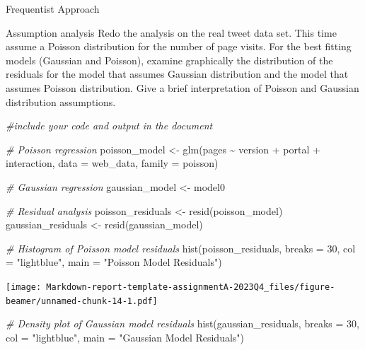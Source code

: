 \documentclass[
  ignorenonframetext,
]{beamer}
\newenvironment{Shaded}{\begin{snugshade}}{\end{snugshade}}
\newcommand{\AttributeTok}[1]{\textcolor[rgb]{0.77,0.63,0.00}{#1}}
\newcommand{\CommentTok}[1]{\textcolor[rgb]{0.56,0.35,0.01}{\textit{#1}}}
\newcommand{\DecValTok}[1]{\textcolor[rgb]{0.00,0.00,0.81}{#1}}
\newcommand{\FunctionTok}[1]{\textcolor[rgb]{0.00,0.00,0.00}{#1}}
\newcommand{\NormalTok}[1]{#1}
\newcommand{\OtherTok}[1]{\textcolor[rgb]{0.56,0.35,0.01}{#1}}
\newcommand{\SpecialCharTok}[1]{\textcolor[rgb]{0.00,0.00,0.00}{#1}}
\newcommand{\StringTok}[1]{\textcolor[rgb]{0.31,0.60,0.02}{#1}}
\begin{document}
\begin{frame}[fragile]{Frequentist Approach}
\begin{block}{Assumption analysis}
\protect\hypertarget{assumption-analysis}{}
Redo the analysis on the real tweet data set. This time assume a Poisson
distribution for the number of page visits. For the best fitting models
(Gaussian and Poisson), examine graphically the distribution of the
residuals for the model that assumes Gaussian distribution and the model
that assumes Poisson distribution. Give a brief interpretation of
Poisson and Gaussian distribution assumptions.

\begin{Shaded}
\begin{Highlighting}[]
\CommentTok{\#include your code and output in the document}

\CommentTok{\# Poisson regression}
\NormalTok{poisson\_model }\OtherTok{\textless{}{-}} \FunctionTok{glm}\NormalTok{(pages }\SpecialCharTok{\textasciitilde{}}\NormalTok{ version }\SpecialCharTok{+}\NormalTok{ portal }\SpecialCharTok{+}\NormalTok{ interaction, }\AttributeTok{data =}\NormalTok{ web\_data, }\AttributeTok{family =}\NormalTok{ poisson)}

\CommentTok{\# Gaussian regression}
\NormalTok{gaussian\_model }\OtherTok{\textless{}{-}}\NormalTok{ model0}

\CommentTok{\# Residual analysis}
\NormalTok{poisson\_residuals }\OtherTok{\textless{}{-}} \FunctionTok{resid}\NormalTok{(poisson\_model)}
\NormalTok{gaussian\_residuals }\OtherTok{\textless{}{-}} \FunctionTok{resid}\NormalTok{(gaussian\_model)}

\CommentTok{\# Histogram of Poisson model residuals}
\FunctionTok{hist}\NormalTok{(poisson\_residuals, }\AttributeTok{breaks =} \DecValTok{30}\NormalTok{, }\AttributeTok{col =} \StringTok{"lightblue"}\NormalTok{, }\AttributeTok{main =} \StringTok{"Poisson Model Residuals"}\NormalTok{)}
\end{Highlighting}
\end{Shaded}

\texttt{[image: Markdown-report-template-assignmentA-2023Q4\_files/figure-beamer/unnamed-chunk-14-1.pdf]}

\begin{Shaded}
\begin{Highlighting}[]
\CommentTok{\# Density plot of Gaussian model residuals}
\FunctionTok{hist}\NormalTok{(gaussian\_residuals, }\AttributeTok{breaks =} \DecValTok{30}\NormalTok{, }\AttributeTok{col =} \StringTok{"lightblue"}\NormalTok{, }\AttributeTok{main =} \StringTok{"Gaussian Model Residuals"}\NormalTok{)}
\end{Highlighting}
\end{Shaded}


\end{block}
\end{frame}
\end{document}
